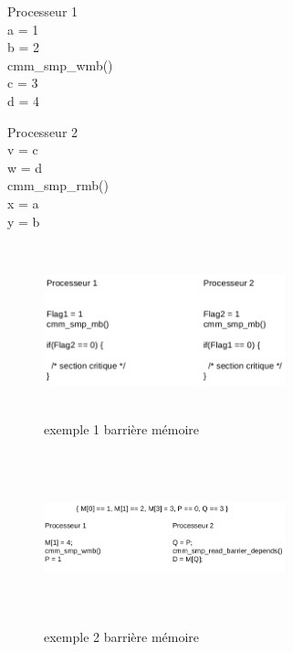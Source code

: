 \documentclass[oneside]{book}
\begin{document}
\begin{multicols}{2}
Processeur 1\\

a = 1\\
b = 2\\
cmm\_smp\_wmb()\\
c = 3\\
d = 4\\

\columnbreak

Processeur 2\\

v = c\\
w = d\\
cmm\_smp\_rmb()\\
x = a\\
y = b\\
\end{multicols}

\begin{figure}[!ht]
\centering
\includegraphics[height=5cm, width=7cm, keepaspectratio]{barrierememoire1.png}
\caption{exemple 1 barrière mémoire}
\label{fig:exemple1barriere}
\end{figure}

\begin{figure}[!ht]
\centering
\includegraphics[height=5cm, width=7cm, keepaspectratio]{barrierememoire2.png}
\caption{exemple 2 barrière mémoire}
\label{fig:exemple2barriere}
\end{figure}
\end{document}
